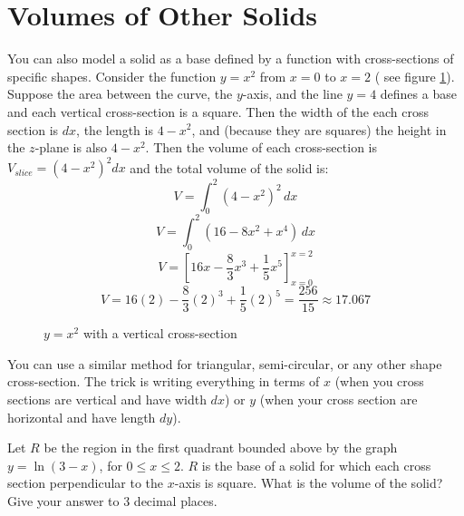 \section{Volumes of Other Solids}
You can also model a solid as a base defined by a function with cross-sections 
of specific shapes. Consider the function $y = x^2$ from $x = 0$ to $x = 2$ (
see figure \ref{fig:parab}). Suppose the area between the curve, the $y$-axis, 
and the line $y = 4$ defines a base and each vertical cross-section is a 
square. Then the width of the each cross section is $dx$, the length is $4 - 
x^2$, and (because they are squares) the height in the $z$-plane is also $4 - 
x^2$. Then the volume of each cross-section is $V_{slice} = \left(4 - x^2 
\right)^2 dx$ and the total volume of the solid is:
$$V = \int_0^2 \left(4 - x^2 \right) ^ 2\,dx$$
$$V = \int_0^2 \left( 16 - 8x^2 + x^4 \right)\,dx$$
$$V = \left[16x - \frac{8}{3}x^3 + \frac{1}{5}x^5 \right]_{x = 0}^{x = 2}$$
$$V = 16(2) - \frac{8}{3}(2)^3 + \frac{1}{5}(2)^5 = \frac{256}{15} 
\approx 17.067$$

\begin{figure}[htbp]
\centering
	\caption{$y = x^2$ with a vertical cross-section}
	\label{fig:parab} 
\end{figure}

You can use a similar method for triangular, semi-circular, or any other shape 
cross-section. The trick is writing everything in terms of $x$ (when you cross 
sections are vertical and have width $dx$) or $y$ (when your cross section are 
horizontal and have length $dy$). 

\begin{Exercise} Let $R$ be the region in the first 
quadrant bounded above by the graph $y = \ln{(3 - x)}$, for $0 \leq x \leq 2$. 
$R$ is the base of a solid for which each cross section perpendicular to the 
$x$-axis is square. What is the volume of the solid? Give your answer to 3 
decimal places. 
\vspace{50mm}
\end{Exercise}

